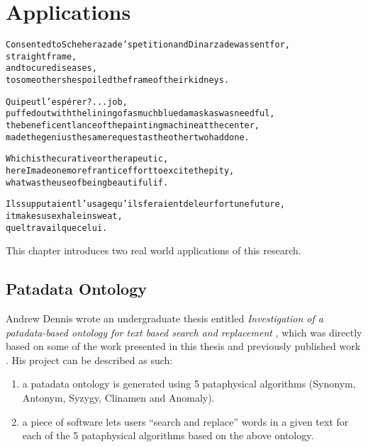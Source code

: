 
\chapter{Applications}
\label{ch:applications}

\startcontents[chapters]

\vfill

\begin{alltt}\sffamily
Consented to Scheherazade's petition and Dinarzade was sent for,
straight frame,
and to cure diseases,
to some others he spoiled the frame of their kidneys.

Qui peut l'espérer ?... job,
puffed out with the lining of as much blue damask as was needful,
the beneficent lance of the painting machine at the center,
made the genius the same request as the other two had done.

Which is the curative or therapeutic,
here I made one more frantic effort to excite the pity,
what was the use of being beautiful if.

Ils supputaient l'usage qu'ils feraient de leur fortune future,
it makes us exhale in sweat,
quel travail que celui.
\end{alltt}

\newpage
\minicontents
\spirals

This chapter introduces two real world applications of this research. 


\section{Patadata Ontology}
\label{s:dennis}

Andrew Dennis wrote an undergraduate thesis entitled \textit{Investigation of a patadata-based ontology for text based search and replacement} \citeyear{Dennis2016}, which was directly based on some of the work presented in this thesis and previously published work \autocite{Raczinski2013,Hugill2013d}. His project can be described as such:

\begin{enumerate}
  \item a patadata ontology is generated using 5 pataphysical algorithms (Synonym, Antonym, Syzygy, Clinamen and Anomaly).
  \item a piece of software lets users ``search and replace'' words in a given text for each of the 5 pataphysical algorithms based on the above ontology.
\end{enumerate}

